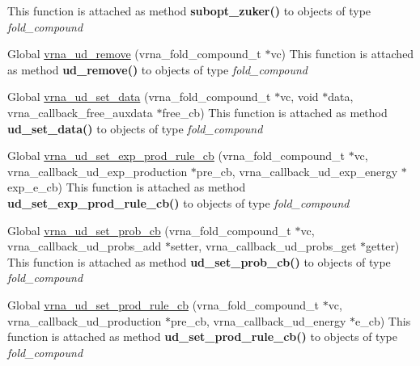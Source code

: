 \begin{DoxyRefList}
%
 This function is attached as method {\bfseries{subopt\+\_\+zuker()}} to objects of type {\itshape fold\+\_\+compound}  
\item[Global \mbox{\hyperlink{group__domains__up_gada59cb0c498b812eadd010811af3f2d4}{vrna\+\_\+ud\+\_\+remove}} (vrna\+\_\+fold\+\_\+compound\+\_\+t $\ast$vc)]\label{wrappers__wrappers000083}%
%
 This function is attached as method {\bfseries{ud\+\_\+remove()}} to objects of type {\itshape fold\+\_\+compound}  
\item[Global \mbox{\hyperlink{group__domains__up_gac1f18c312b91d80089534a87d956e58b}{vrna\+\_\+ud\+\_\+set\+\_\+data}} (vrna\+\_\+fold\+\_\+compound\+\_\+t $\ast$vc, void $\ast$data, vrna\+\_\+callback\+\_\+free\+\_\+auxdata $\ast$free\+\_\+cb)]\label{wrappers__wrappers000084}%
%
 This function is attached as method {\bfseries{ud\+\_\+set\+\_\+data()}} to objects of type {\itshape fold\+\_\+compound}  
\item[Global \mbox{\hyperlink{group__domains__up_ga2fb1db2099da26c76247e1209ad4aa09}{vrna\+\_\+ud\+\_\+set\+\_\+exp\+\_\+prod\+\_\+rule\+\_\+cb}} (vrna\+\_\+fold\+\_\+compound\+\_\+t $\ast$vc, vrna\+\_\+callback\+\_\+ud\+\_\+exp\+\_\+production $\ast$pre\+\_\+cb, vrna\+\_\+callback\+\_\+ud\+\_\+exp\+\_\+energy $\ast$exp\+\_\+e\+\_\+cb)]\label{wrappers__wrappers000086}%
%
 This function is attached as method {\bfseries{ud\+\_\+set\+\_\+exp\+\_\+prod\+\_\+rule\+\_\+cb()}} to objects of type {\itshape fold\+\_\+compound}  
\item[Global \mbox{\hyperlink{unstructured__domains_8h_a13ac877c9db89a1a5b5d9c0394148595}{vrna\+\_\+ud\+\_\+set\+\_\+prob\+\_\+cb}} (vrna\+\_\+fold\+\_\+compound\+\_\+t $\ast$vc, vrna\+\_\+callback\+\_\+ud\+\_\+probs\+\_\+add $\ast$setter, vrna\+\_\+callback\+\_\+ud\+\_\+probs\+\_\+get $\ast$getter)]\label{wrappers__wrappers000087}%
%
 This function is attached as method {\bfseries{ud\+\_\+set\+\_\+prob\+\_\+cb()}} to objects of type {\itshape fold\+\_\+compound}  
\item[Global \mbox{\hyperlink{group__domains__up_ga745a99f0bc72898d54de16f6e538828a}{vrna\+\_\+ud\+\_\+set\+\_\+prod\+\_\+rule\+\_\+cb}} (vrna\+\_\+fold\+\_\+compound\+\_\+t $\ast$vc, vrna\+\_\+callback\+\_\+ud\+\_\+production $\ast$pre\+\_\+cb, vrna\+\_\+callback\+\_\+ud\+\_\+energy $\ast$e\+\_\+cb)]\label{wrappers__wrappers000085}%
%
 This function is attached as method {\bfseries{ud\+\_\+set\+\_\+prod\+\_\+rule\+\_\+cb()}} to objects of type {\itshape fold\+\_\+compound} 
\end{DoxyRefList}